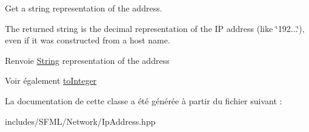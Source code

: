 Get a string representation of the address. 

The returned string is the decimal representation of the IP address (like \char`\"{}192...\char`\"{}), even if it was constructed from a host name.

\begin{DoxyReturn}{Renvoie}
\hyperlink{classsf_1_1String}{String} representation of the address
\end{DoxyReturn}
\begin{DoxySeeAlso}{Voir également}
\hyperlink{classsf_1_1IpAddress_ae7911c5ea9562f9602c3e29cd54b15e9}{to\+Integer} 
\end{DoxySeeAlso}


La documentation de cette classe a été générée à partir du fichier suivant \+:\begin{DoxyCompactItemize}
\item 
includes/\+S\+F\+M\+L/\+Network/Ip\+Address.\+hpp\end{DoxyCompactItemize}

